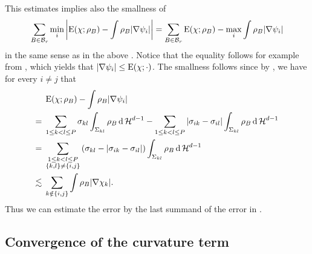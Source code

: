 \begin{remark}
	\label{localization_estimate_weaker}
	This estimates implies also the smallness of
	\begin{equation*}
		\sum_{ B \in \mathcal{ B }_{ r } }
		\min_{ i }
		\abs{
			\operatorname{E} ( \chi; \rho_{ B } )
			-
			\int
			\rho_{ B }
			\abs{ \nabla \psi_{ i } }
		}
		=
		\sum_{ B \in \mathcal{ B }_{ r } }
		\operatorname{E} ( \chi ; \rho_{ B } )
		-
		\max_{ i }
		\int
		\rho_{ B }
		\abs{ \nabla \psi_{ i } }
	\end{equation*}
	in the same sense as in the above . 
	Notice that the equality follows for example from 
	, which yields that $ \abs{ 
	\nabla 
		\psi_{ i } } \leq \operatorname{E} ( \chi ; \cdot )$. The smallness follows 
		since by 
	, we have for every $ i \neq j $ that
	\begin{align*}
		&
		\operatorname{E} ( \chi ; \rho_{ B } ) 
		-
		\int
		\rho_{ B }
		\abs{ \nabla \psi_{ i } }
		\\
		={} &
		\sum_{ 1 \leq k < l \leq P }
		\sigma_{ k l }
		\int_{ \Sigma_{ k l } }
		\rho_{ B }
		\dd{ \operatorname{\mathcal{H}}^{ d -1 } }
		-
		\sum_{ 1 \leq k < l \leq P }
		\abs{ \sigma_{ i k } - \sigma_{ i l } }
		\int_{ \Sigma_{ k l } }
		\rho_{ B }
		\dd{ \operatorname{\mathcal{H}}^{ d - 1 } }
		\\
		={} &
		\sum_{ \substack{1 \leq k < l \leq P \\ \{ k, l \} \neq \{ i, j \} } }
		\left(
		\sigma_{ k l } - \abs{ \sigma_{ i k } - \sigma_{ i l } }
		\right)
		\int_{ \Sigma_{ k l } }
		\rho_{ B }
		\dd{ \operatorname{\mathcal{H}}^{ d - 1 } }
		\\
		\lesssim{} &
		\sum_{ k \notin \{ i, j \} }
		\int
		\rho_{ B }
		\abs{ \nabla \chi_{ k } }.
	\end{align*}
	Thus we can estimate the error by the last summand of the error in 
	.
\end{remark}
\subsection{Convergence of the curvature term}

